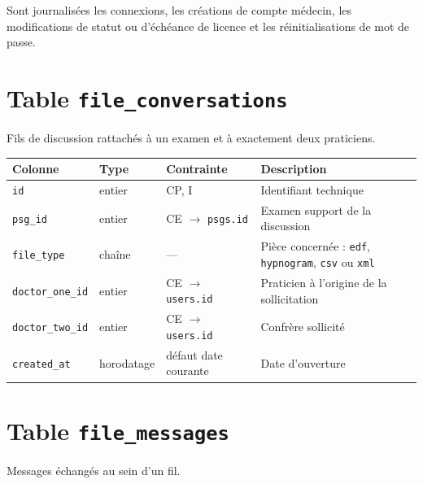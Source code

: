 \noindent
Sont journalisées les connexions, les créations de compte médecin, les modifications de
statut ou d'échéance de licence et les réinitialisations de mot de passe.

\section{Table \texttt{file\_conversations}}

Fils de discussion rattachés à un examen et à exactement deux praticiens.

\begin{table}[H]
\centering
\small
\begin{tabular}{@{}lllL{5.5cm}@{}}
\toprule
\textbf{Colonne} & \textbf{Type} & \textbf{Contrainte} & \textbf{Description} \\
\midrule
\texttt{id}              & entier     & CP, I & Identifiant technique \\
\texttt{psg\_id}         & entier     & CE $\to$ \texttt{psgs.id} & Examen support de
                                                 la discussion \\
\texttt{file\_type}      & chaîne     & --- & Pièce concernée : \texttt{edf},
                                        \texttt{hypnogram}, \texttt{csv} ou
                                        \texttt{xml} \\
\texttt{doctor\_one\_id} & entier     & CE $\to$ \texttt{users.id} & Praticien à
                                                 l'origine de la sollicitation \\
\texttt{doctor\_two\_id} & entier     & CE $\to$ \texttt{users.id} & Confrère sollicité \\
\texttt{created\_at}     & horodatage & défaut date courante & Date d'ouverture \\
\bottomrule
\end{tabular}
\end{table}

\section{Table \texttt{file\_messages}}

Messages échangés au sein d'un fil.

